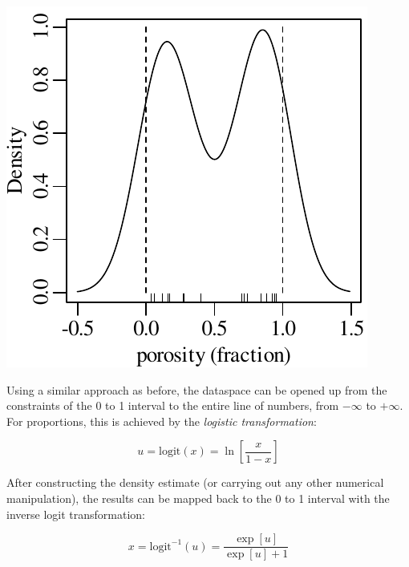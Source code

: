 \noindent\begin{minipage}[t][][b]{.3\textwidth}
  \includegraphics[width=\textwidth]{../figures/porosityKDE.pdf}\medskip
\end{minipage}
\begin{minipage}[t][][t]{.7\textwidth}
  \label{fig:porosityKDE}
\end{minipage}

Using a similar approach as before, the dataspace can be opened up
from the constraints of the 0 to 1 interval to the entire line of
numbers, from $-\infty$ to $+\infty$. For proportions, this is
achieved by the \emph{logistic transformation}:

\begin{equation}
  u = \mbox{logit}(x) = \ln\!\left[\frac{x}{1-x}\right]
  \label{eq:logit}
\end{equation}

After constructing the density estimate (or carrying out any other
numerical manipulation), the results can be mapped back to the 0 to 1
interval with the inverse logit transformation:

\begin{equation}
  x = \mbox{logit}^{-1}(u) = \frac{\exp[u]}{\exp[u]+1}
  \label{eq:invlogit}
\end{equation}

